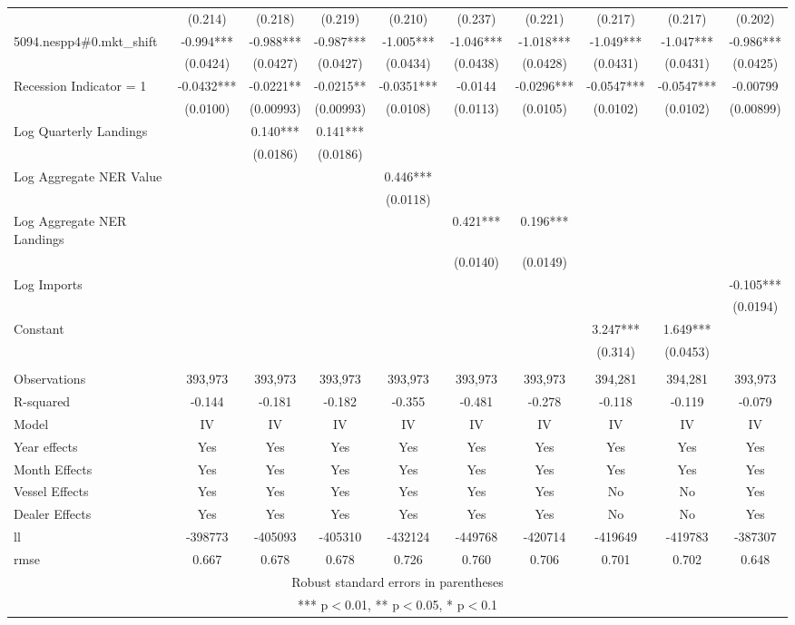 \begin{tabular}{lccccccccc}
 & (0.214) & (0.218) & (0.219) & (0.210) & (0.237) & (0.221) & (0.217) & (0.217) & (0.202) \\
5094.nespp4\#0.mkt\_shift & -0.994*** & -0.988*** & -0.987*** & -1.005*** & -1.046*** & -1.018*** & -1.049*** & -1.047*** & -0.986*** \\
 & (0.0424) & (0.0427) & (0.0427) & (0.0434) & (0.0438) & (0.0428) & (0.0431) & (0.0431) & (0.0425) \\
Recession Indicator = 1 & -0.0432*** & -0.0221** & -0.0215** & -0.0351*** & -0.0144 & -0.0296*** & -0.0547*** & -0.0547*** & -0.00799 \\
 & (0.0100) & (0.00993) & (0.00993) & (0.0108) & (0.0113) & (0.0105) & (0.0102) & (0.0102) & (0.00899) \\
Log Quarterly Landings &  & 0.140*** & 0.141*** &  &  &  &  &  &  \\
 &  & (0.0186) & (0.0186) &  &  &  &  &  &  \\
Log Aggregate NER Value &  &  &  & 0.446*** &  &  &  &  &  \\
 &  &  &  & (0.0118) &  &  &  &  &  \\
Log Aggregate NER Landings &  &  &  &  & 0.421*** & 0.196*** &  &  &  \\
 &  &  &  &  & (0.0140) & (0.0149) &  &  &  \\
Log Imports &  &  &  &  &  &  &  &  & -0.105*** \\
 &  &  &  &  &  &  &  &  & (0.0194) \\
Constant &  &  &  &  &  &  & 3.247*** & 1.649*** &  \\
 &  &  &  &  &  &  & (0.314) & (0.0453) &  \\
 &  &  &  &  &  &  &  &  &  \\
Observations & 393,973 & 393,973 & 393,973 & 393,973 & 393,973 & 393,973 & 394,281 & 394,281 & 393,973 \\
R-squared & -0.144 & -0.181 & -0.182 & -0.355 & -0.481 & -0.278 & -0.118 & -0.119 & -0.079 \\
Model & IV & IV & IV & IV & IV & IV & IV & IV & IV \\
Year effects & Yes & Yes & Yes & Yes & Yes & Yes & Yes & Yes & Yes \\
Month Effects & Yes & Yes & Yes & Yes & Yes & Yes & Yes & Yes & Yes \\
Vessel Effects & Yes & Yes & Yes & Yes & Yes & Yes & No & No & Yes \\
Dealer Effects & Yes & Yes & Yes & Yes & Yes & Yes & No & No & Yes \\
ll & -398773 & -405093 & -405310 & -432124 & -449768 & -420714 & -419649 & -419783 & -387307 \\
 rmse & 0.667 & 0.678 & 0.678 & 0.726 & 0.760 & 0.706 & 0.701 & 0.702 & 0.648 \\ \hline
\multicolumn{10}{c}{ Robust standard errors in parentheses} \\
\multicolumn{10}{c}{ *** p$<$0.01, ** p$<$0.05, * p$<$0.1} \\
\end{tabular}
